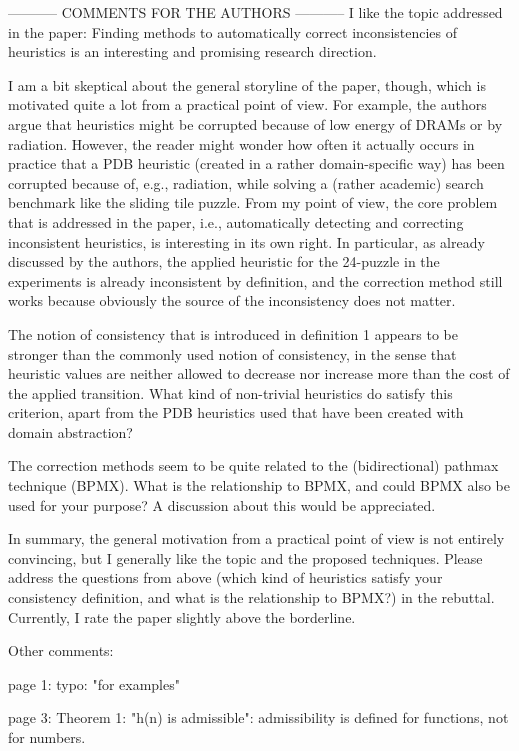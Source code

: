 ----------- COMMENTS FOR THE AUTHORS -----------
I like the topic addressed in the paper: Finding methods to
automatically correct inconsistencies of heuristics is an interesting
and promising research direction.

I am a bit skeptical about the general storyline of the paper, though,
which is motivated quite a lot from a practical point of view. For
example, the authors argue that heuristics might be corrupted because
of low energy of DRAMs or by radiation. However, the reader might
wonder how often it actually occurs in practice that a PDB heuristic
(created in a rather domain-specific way) has been corrupted because
of, e.g., radiation, while solving a (rather academic) search
benchmark like the sliding tile puzzle. From my point of view, the
core problem that is addressed in the paper, i.e., automatically
detecting and correcting inconsistent heuristics, is interesting in
its own right. In particular, as already discussed by the authors, the
applied heuristic for the 24-puzzle in the experiments is already
inconsistent by definition, and the correction method still works
because obviously the source of the inconsistency does not matter.

The notion of consistency that is introduced in definition 1 appears
to be stronger than the commonly used notion of consistency, in the
sense that heuristic values are neither allowed to decrease nor
increase more than the cost of the applied transition. What kind of
non-trivial heuristics do satisfy this criterion, apart from the PDB
heuristics used that have been created with domain abstraction?

The correction methods seem to be quite related to the (bidirectional)
pathmax technique (BPMX). What is the relationship to BPMX, and could
BPMX also be used for your purpose? A discussion about this would be
appreciated.

In summary, the general motivation from a practical point of view is
not entirely convincing, but I generally like the topic and the
proposed techniques. Please address the questions from above (which
kind of heuristics satisfy your consistency definition, and what is
the relationship to BPMX?) in the rebuttal. Currently, I rate the
paper slightly above the borderline.


Other comments:

page 1: typo: "for examples"

page 3: Theorem 1: "h(n) is admissible": admissibility is defined for
functions, not for numbers.

